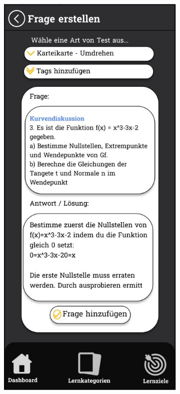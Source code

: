     \newpage

    \begin{figure}[htbp]
        \centering
        \begin{subfigure}[b]{0.45\linewidth}
          \centering
          \includegraphics[width=\linewidth]{images/Mockups/FrageErstellen.JPG}

\end{subfigure}
\end{figure}
